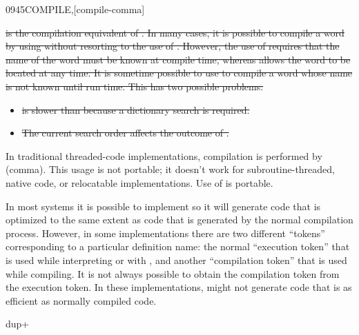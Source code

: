 \begin{worddef}{0945}{COMPILE,}[compile-comma]
\begin{rationale}
\sout{%
		 is the compilation equivalent of
		. In many cases, it is possible to compile a
		word by using  without resorting to the use of
		. However, the use of  requires
		that the name of the word must be known at compile time,
		whereas  allows the word to be located at any
		time. It is sometime possible to use  to compile
		a word whose name is not known until run time. This has two
		possible problems:}
		\begin{itemize}
		\item \sout{ is slower than  because a
			dictionary search is required.}
		\item \sout{The current search order affects the outcome of
			.}
		\end{itemize}
\cbend

		In traditional threaded-code implementations, compilation is
		performed by \word{,} (comma). This usage is not portable; it
		doesn't work for subroutine-threaded, native code, or
		relocatable implementations. Use of  is portable.

		In most systems it is possible to implement  so
		it will generate code that is optimized to the same extent as
		code that is generated by the normal compilation process.
		However, in some implementations there are two different
		``tokens'' corresponding to a particular definition name:
		the normal ``execution token'' that is used while interpreting
		or with , and another ``compilation token'' that
		is used while compiling. It is not always possible to obtain
		the compilation token from the execution token. In these
		implementations,  might not generate code that
		is as efficient as normally compiled code.
	\end{rationale}

	\begin{testing}\ttfamily
		  \word{+} \word{;}  dup+ \\
		 \\
		 \\
	\end{testing}
\end{worddef}


